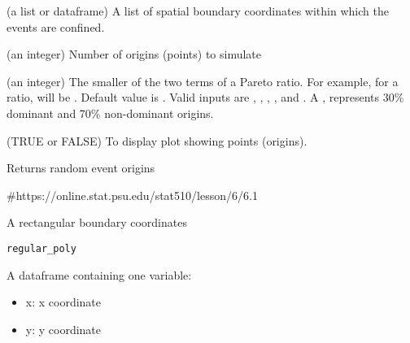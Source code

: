 \documentclass[a4paper]{book}
\begin{document}
\begin{Arguments}
\begin{ldescription}
\item[\code{poly}] (a list or dataframe) A list of spatial boundary
coordinates within which the events are confined.

\item[\code{npoints}] (an integer) Number of origins (points) to simulate

\item[\code{p\_ratio}] (an integer) The smaller of the
two terms of a Pareto ratio. For example, for a 
ratio,  will be . Default value is
. Valid inputs are , ,
, , and . A , represents
30\% dominant and 70\% non-dominant origins.

\item[\code{show.plot}] (TRUE or FALSE) To display plot showing
points (origins).
\end{ldescription}
\end{Arguments}
%
\begin{Value}
Returns random event origins
\end{Value}
%
\begin{References}\relax
\#https://online.stat.psu.edu/stat510/lesson/6/6.1
\end{References}
%
\begin{Description}\relax
A rectangular boundary coordinates
\end{Description}
%
\begin{Usage}
\begin{verbatim}
regular_poly
\end{verbatim}
\end{Usage}
%
\begin{Format}
A dataframe containing one variable:
\begin{itemize}

\item{} x: x coordinate
\item{} y: y coordinate

\end{itemize}

\end{Format}
\end{document}
